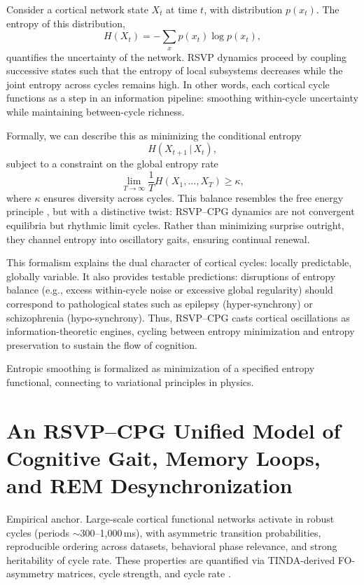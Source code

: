 \documentclass{article}
\begin{document}
Consider a cortical network state $X_t$ at time $t$, with distribution $p(x_t)$. The entropy of this distribution,
\begin{equation}
H(X_t) = - \sum_x p(x_t) \log p(x_t),
\end{equation}
quantifies the uncertainty of the network. RSVP dynamics proceed by coupling successive states such that the entropy of local subsystems decreases while the joint entropy across cycles remains high. In other words, each cortical cycle functions as a step in an information pipeline: smoothing within-cycle uncertainty while maintaining between-cycle richness.

Formally, we can describe this as minimizing the conditional entropy
\begin{equation}
H(X_{t+1} \,|\, X_t),
\end{equation}
subject to a constraint on the global entropy rate
\begin{equation}
\lim_{T \to \infty} \frac{1}{T} H(X_1, \dots, X_T) \geq \kappa,
\end{equation}
where $\kappa$ ensures diversity across cycles. This balance resembles the free energy principle \citep{friston2010free}, but with a distinctive twist: RSVP--CPG dynamics are not convergent equilibria but rhythmic limit cycles. Rather than minimizing surprise outright, they channel entropy into oscillatory gaits, ensuring continual renewal.

This formalism explains the dual character of cortical cycles: locally predictable, globally variable. It also provides testable predictions: disruptions of entropy balance (e.g., excess within-cycle noise or excessive global regularity) should correspond to pathological states such as epilepsy (hyper-synchrony) or schizophrenia (hypo-synchrony). Thus, RSVP--CPG casts cortical oscillations as information-theoretic engines, cycling between entropy minimization and entropy preservation to sustain the flow of cognition.


Entropic smoothing is formalized as minimization of a specified entropy functional, connecting to variational principles in physics.

\section{An RSVP--CPG Unified Model of Cognitive Gait, Memory Loops, and REM Desynchronization}

Empirical anchor. Large-scale cortical functional networks activate in robust cycles (periods $\sim$300--1{,}000\,ms), with asymmetric transition probabilities, reproducible ordering across datasets, behavioral phase relevance, and strong heritability of cycle rate. These properties are quantified via TINDA-derived FO-asymmetry matrices, cycle strength, and cycle rate \citep{van2025cortical}.
\end{document}
